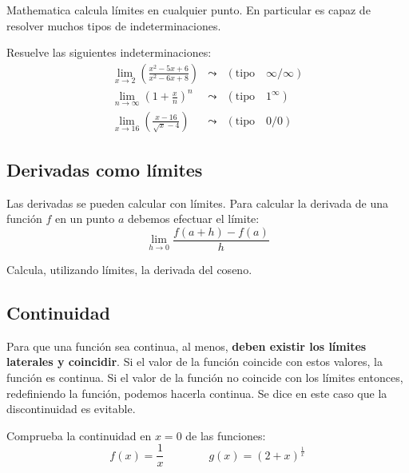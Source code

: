 \documentclass[a4paper,10pt, draft]{article}
\newenvironment{ejer}{\begin{tcolorbox}[center title, title=Ejercicios,
fonttitle=\sffamily\bfseries,colback=blue!5,colframe=orange]}{\end{tcolorbox}}
\begin{document}
 Mathematica calcula límites en cualquier punto. En particular es capaz de resolver muchos tipos de indeterminaciones.
 
 \begin{ejer}

 
Resuelve las siguientes indeterminaciones:
\begin{eqnarray*}
\lim_{x\rightarrow 2}\left(\frac{x^2-5x+6}{x^2-6x+8}\right) &\leadsto & (\mathrm{ tipo }\quad \infty/\infty) \\
 \lim_{n\rightarrow \infty} \left(1+\frac{x}{n}\right)^n &\leadsto & (\mathrm{ tipo } \quad 1^\infty) \\
\lim_{x\rightarrow 16} \left(\frac{x-16}{\sqrt{x}-4}\right)  &\leadsto & (\mathrm{ tipo } \quad 0/0)
\end{eqnarray*}

\end{ejer}  \newpage

\subsection{Derivadas como límites}

Las derivadas se pueden calcular con límites. Para calcular la derivada de una función $f$ en un punto $a$ debemos efectuar el límite:
\[
\lim_{h\rightarrow 0} \frac{f(a+h)-f(a)}{h}
\]


\begin{ejer}

Calcula, utilizando límites, la derivada del coseno.

\end{ejer}  \newpage

\subsection{Continuidad}


Para que una función sea continua, al menos, \textbf{deben existir los límites laterales y coincidir}. Si el valor de la función coincide con estos valores, la función es continua. Si el valor de la función no coincide con los límites entonces, redefiniendo la función, podemos hacerla continua. Se dice en este caso que la discontinuidad es evitable.

\begin{ejer}

Comprueba la continuidad en $x=0$ de las funciones:
$$
f(x) = \frac{1}{x} \qquad \qquad g(x)=(2+x)^\frac{1}{x} 
$$

\end{ejer}  \newpage
\end{document}

